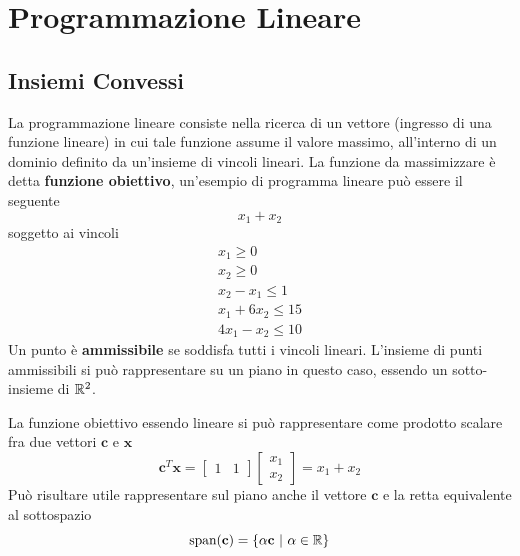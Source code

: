\documentclass[10pt, letterpaper]{report}
\begin{document}
\chapter{Programmazione Lineare}
\section{Insiemi Convessi}
La programmazione lineare consiste nella ricerca di un vettore (ingresso di una funzione lineare) in cui tale funzione assume il valore massimo, all'interno di un dominio definito da un'insieme di vincoli lineari. La funzione da massimizzare è detta \textbf{funzione obiettivo}, un'esempio di programma lineare può essere il seguente 
$$ x_1+x_2$$
soggetto ai vincoli 
$$ \begin{matrix}
    x_1\ge 0 \\ 
    x_2 \ge 0 \\ 
    x_2-x_1\le 1 \\ 
    x_1+6x_2\le 15 \\ 
    4x_1-x_2\le 10
\end{matrix}$$
Un punto è \textbf{ammissibile} se soddisfa tutti i vincoli lineari.
L'insieme di punti ammissibili si può rappresentare su un piano in questo caso, essendo un sotto-insieme di ${\mathbb R}^2$.
\begin{figure}[h]
\end{figure}
La funzione obiettivo essendo lineare si può rappresentare come prodotto scalare fra due vettori $\mathbf c$ e $\mathbf x$ 
$$\mathbf c^T\mathbf x=\begin{bmatrix}
    1&1
\end{bmatrix}\begin{bmatrix}
    x_1\\ x_2
\end{bmatrix} =x_1+x_2$$
Può risultare utile rappresentare sul piano anche il vettore $\mathbf c$ e la retta equivalente al sottospazio $$\text{span}(\mathbf c)=\{\alpha \mathbf c \ | \ \alpha \in \R\}$$
\end{document}
